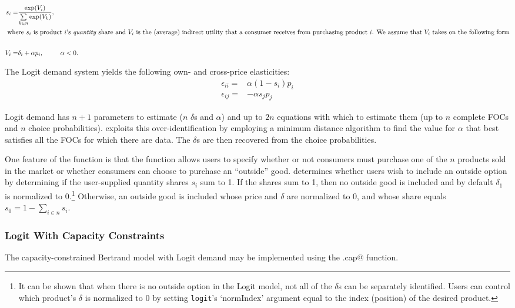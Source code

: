 \documentclass[11pt,numbers=noenddot,pointlessnumbers]{scrreprt}
\numberwithin{equation}{section}
\begin{document}
\begin{align*}
  s_i=& \frac{\exp(V_i)}{\sum\limits_{k \in n}\exp(V_k)},&\\
  \intertext{ where  $s_i$ is product $i$'s \emph{quantity} share and
    $V_i$ is the (average) indirect utility that a consumer
    receives from purchasing product $i$. We assume that $V_i$ takes on
    the following form}\\
  V_i=&\delta_i + \alpha p_i,&\alpha<0.
\end{align*}

The Logit demand system yields the following own- and cross-price elasticities:
\begin{align*}
  \epsilon_{ii}=&\alpha (1-s_i)p_i \\
  \epsilon_{ij}=&-\alpha s_jp_j
\end{align*}

Logit demand has $n+1$ parameters to estimate ($n$ $\delta$s and
$\alpha$) and up to $2n$ equations with which to estimate them (up to
$n$ complete FOCs and $n$
choice probabilities). \verb@calcSlopes@ exploits this over-identification
by employing a minimum distance algorithm to find the
 value for $\alpha$ that best satisfies all the FOCs for which there
 are data. The $\delta$s are then recovered from the choice probabilities.

One feature of the \verb@logit@ function is that the function allows
users to specify whether or not consumers must purchase one of the $n$
products sold in the market or whether consumers can choose to
purchase an ``outside'' good.  \verb@logit@ determines whether users
wish to include an outside option by determining if the user-supplied
quantity shares $s_i$ sum to 1. If the shares sum to 1, then no outside good is
included and by default $\delta_1$ is normalized to 0.\footnote{It can
  be shown that when there is no outside option in the Logit model,
  not all of the $\delta$s can be separately identified. Users can
  control which product's $\delta$ is normalized to 0 by setting
  \texttt{logit}'s `normIndex' argument equal to the index (position) of the desired
  product.} Otherwise, an outside good is included whose price and
$\delta$ are normalized to 0, and whose share  equals $s_0=1-\sum\limits_{i\in n}s_i$.


\subsubsection{Logit With Capacity Constraints}
The capacity-constrained Bertrand model with Logit demand may be implemented using the
\verb@logit.cap@ function.
\end{document}
